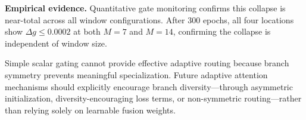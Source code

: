 \textbf{Empirical evidence.} Quantitative gate monitoring confirms this collapse is near-total across all window configurations. After 300 epochs, all four locations show $\Delta g{\leq}0.0002$ at both $M{=}7$ and $M{=}14$, confirming the collapse is independent of window size.

Simple scalar gating cannot provide effective adaptive routing because branch symmetry prevents meaningful specialization. Future adaptive attention mechanisms should explicitly encourage branch diversity---through asymmetric initialization, diversity-encouraging loss terms, or non-symmetric routing---rather than relying solely on learnable fusion weights.

